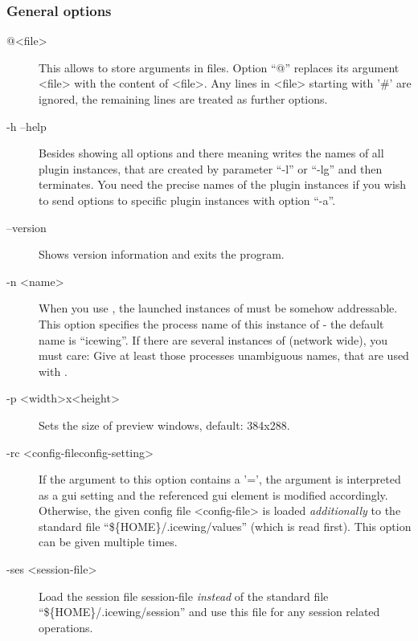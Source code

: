 \subsubsection {General options}

\begin{description}
\item[@\textless{}file\textgreater{}]
  This allows to store arguments in files. Option ``@'' replaces
  its argument \textless{}file\textgreater{} with the content of
  \textless{}file\textgreater{}. Any lines in
  \textless{}file\textgreater{} starting with '\#' are ignored, the
  remaining lines are treated as further options.

\item[-h \textbar{} --help]
  Besides showing all options and there meaning \icewing{} writes
  the names of all plugin instances, that are created by parameter
  ``-l'' or ``-lg'' and then terminates. You need the precise names
  of the plugin instances if you wish to send options to specific
  plugin instances with option ``-a''.

\item[--version]
  Shows version information and exits the program.

\item[-n \textless{}name\textgreater]
  \label{page:opt_n_name}
  When you use \dacs{}, the launched instances of \icewing{} must be
  somehow addressable. This option specifies the process name of this
  instance of \icewing{} - the default name is ``icewing''. If there
  are several instances of \icewing{} (network wide), you must care:
  Give at least those \icewing{} processes unambiguous names, that
  are used with \dacs{}.

\item[-p \textless{}width\textgreater{}x\textless{}height\textgreater{}]
  Sets the size of preview windows, default: 384x288.

\item[-rc \textless{}config-file\textbar{}config-setting\textgreater{}]
  If the argument to this option contains a '=', the argument is
  interpreted as a gui setting and the referenced gui element is
  modified accordingly. Otherwise, the given config file
  \textless{}config-file\textgreater{} is loaded {\em additionally}
  to the standard file ``\$\{HOME\}/.icewing/values'' (which is read
  first). This option can be given multiple times.

\item[-ses \textless{}session-file\textgreater{}]
  Load the session file session-file {\em instead} of the standard
  file ``\$\{HOME\}/.icewing/session'' and use this file for any
  session related operations.


\end{description}
